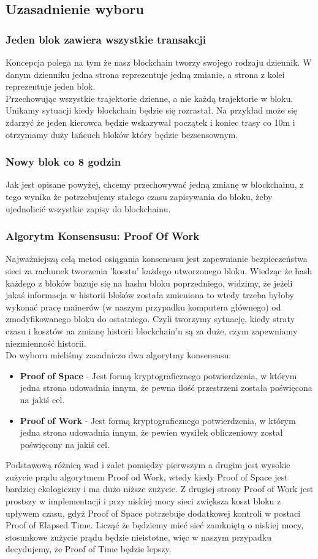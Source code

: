 \documentclass{sprawozdanie-agh}
\begin{document}
\newpage
\subsection{Uzasadnienie wyboru}
\subsubsection{Jeden blok zawiera wszystkie transakcji}
Koncepcja polega na tym że nasz blockchain tworzy swojego rodzaju dziennik. W danym dzienniku jedna strona reprezentuje jedną zmianie, a strona z kolei reprezentuje jeden blok. \\ 
Przechowując wszystkie trajektorie dzienne, a nie każdą trajektorie w bloku. Unikamy sytuacji kiedy blockchain będzie się rozrastał. Na przykład może się zdarzyć że jeden kierowca będzie wskazywał początek i koniec trasy co 10m i otrzymamy duży łańcuch bloków który będzie bezsensownym.

\subsubsection{Nowy blok co 8 godzin}
Jak jest opisane powyżej, chcemy przechowywać jedną zmianę w blockchainu, z tego wynika że potrzebujemy stałego czasu zapisywania do bloku, żeby ujednolicić wszystkie zapisy do blockchainu.
\subsubsection{Algorytm Konsensusu: Proof Of Work}
Najważniejszą celą metod osiągania konsensusu jest zapewnianie bezpieczeństwa sieci za rachunek tworzenia 'kosztu' każdego utworzonego bloku. Wiedząc że hash każdego z bloków bazuje się na hashu bloku poprzedniego, widzimy, że jeżeli jakaś informacja w historii bloków została zmieniona to wtedy trzeba byłoby wykonać pracę mainerów (w naszym przypadku komputera głównego) od zmodyfikowanego bloku do ostatniego. Czyli tworzymy sytuację, kiedy straty czasu i kosztów na zmianę historii blockchain'u są za duże, czym zapewniamy niezmienność historii.\\
Do wyboru mieliśmy zasadniczo dwa algorytmy konsensusu:
\begin{itemize}
    \item \textbf{Proof of Space} - Jest formą kryptograficznego potwierdzenia, w którym jedna strona udowadnia innym, że pewna ilość przestrzeni została poświęcona na jakiś cel.
    \item \textbf{Proof of Work} - Jest formą kryptograficznego potwierdzenia, w którym jedna strona udowadnia innym, że pewien wysiłek obliczeniowy został poświęcony na jakiś cel.
\end{itemize}
    Podstawową różnicą wad i zalet pomiędzy pierwszym a drugim jest wysokie zużycie prądu algorytmem Proof od Work, wtedy kiedy Proof of Space jest bardziej ekologiczny i ma dużo niższe zużycie. Z drugiej strony Proof of Work jest prostszy w implementacji i przy niskiej mocy sieci zwiększa koszt bloku z upływem czasu, gdyż Proof of Space potrzebuje dodatkowej kontroli w postaci Proof of Elapsed Time. Licząć że będziemy mieć sieć zamkniętą o niskiej mocy, stosunkowe zużycie prądu będzie nieistotne, więc w naszym przypadku decydujemy, że Proof of Time będzie lepszy.
\newpage
\end{document}
